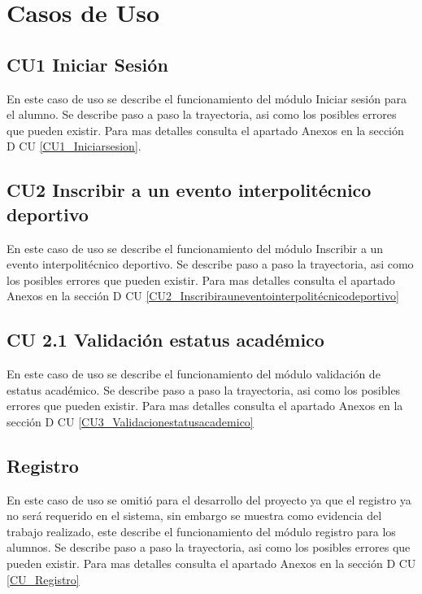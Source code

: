 	
	\section{Casos de Uso}
		\subsection{CU1 Iniciar Sesión}
		\noindent En este caso de uso se describe el funcionamiento del módulo Iniciar sesión para el alumno. Se describe paso a paso la trayectoria, asi como los posibles errores que pueden existir. Para mas detalles consulta el apartado Anexos en la sección D CU \ref{CU1_Iniciarsesion}.
		
		\subsection{CU2 Inscribir a un evento interpolitécnico deportivo}
		\noindent En este caso de uso se describe el funcionamiento del módulo Inscribir a un evento interpolitécnico deportivo. Se describe paso a paso la trayectoria, asi como los posibles errores que pueden existir. Para mas detalles consulta el apartado Anexos en la sección D CU \ref{CU2_Inscribirauneventointerpolitécnicodeportivo}
		
		\subsection{CU 2.1 Validación estatus académico}
		\noindent En este caso de uso se describe el funcionamiento del módulo validación de estatus académico. Se describe paso a paso la trayectoria, asi como los posibles errores que pueden existir. Para mas detalles consulta el apartado Anexos en la sección D CU  \ref{CU3_Validacionestatusacademico}
		
		\subsection{Registro}
		\noindent En este caso de uso se omitió para el desarrollo del proyecto ya que el registro ya no será requerido en el sistema, sin embargo se muestra como evidencia del trabajo realizado, este describe el funcionamiento del módulo registro para los alumnos. Se describe paso a paso la trayectoria, asi como los posibles errores que pueden existir. Para mas detalles consulta el apartado Anexos en la sección D CU \ref{CU_Registro}
		
